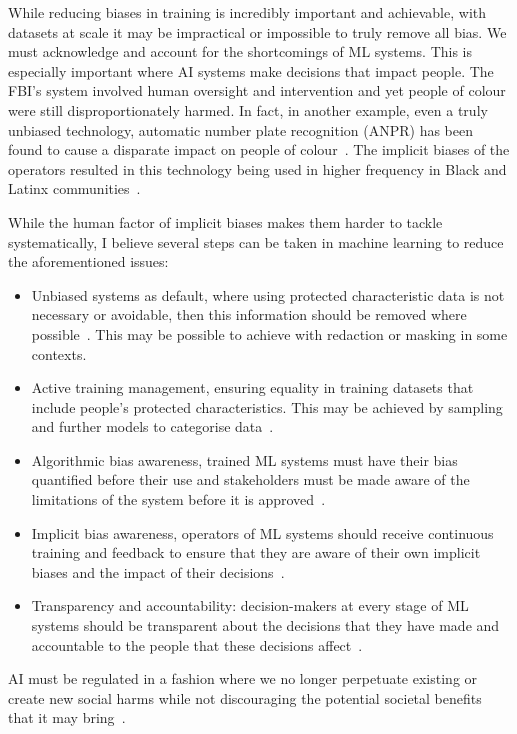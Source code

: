 \documentclass[]{final_report}
\begin{document}
\newpage
While reducing biases in training is incredibly important and achievable, with datasets at scale it may be impractical or impossible to truly remove all bias. We must acknowledge and account for the shortcomings of ML systems. This is especially important where AI systems make decisions that impact people. The FBI's system involved human oversight and intervention and yet people of colour were still disproportionately harmed. In fact, in another example, even a truly unbiased technology, automatic number plate recognition (ANPR) has been found to cause a disparate impact on people of colour~\cite{anprAccountability}. The implicit biases of the operators resulted in this technology being used in higher frequency in Black and Latinx communities~\cite{anprAccountability}\cite{facialRecognitionBias}.

While the human factor of implicit biases makes them harder to tackle systematically, I believe several steps can be taken in machine learning to reduce  the aforementioned issues:
\begin{itemize}
  \item Unbiased systems as default, where using protected characteristic data is not necessary or avoidable, then this information should be removed where possible~\cite{AIRisksAndPrinciples}. This may be possible to achieve with redaction or masking in some contexts.
  \item Active training management, ensuring equality in training datasets that include people's protected characteristics. This may be achieved by sampling and further models to categorise data~\cite{AIRisksAndPrinciples}.
  \item Algorithmic bias awareness, trained ML systems must have their bias quantified before their use and stakeholders must be made aware of the limitations of the system before it is approved~\cite{AIRisksAndPrinciples}.
  \item Implicit bias awareness, operators of ML systems should receive continuous training and feedback to ensure that they are aware of their own implicit biases and the impact of their decisions~\cite{facialRecognitionBias}.
  \item Transparency and accountability: decision-makers at every stage of ML systems should be transparent about the decisions that they have made and accountable to the people that these decisions affect~\cite{AIRisksAndPrinciples}.
\end{itemize}
AI must be regulated in a fashion where we no longer perpetuate existing or create new social harms while not discouraging the potential societal benefits that it may bring~\cite{AIRisksAndPrinciples}. 
\end{document}

